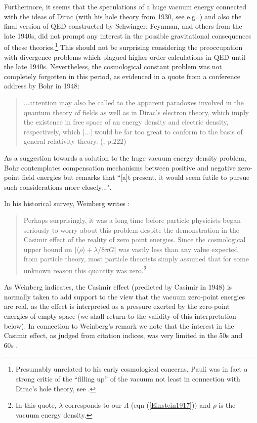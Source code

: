 \documentclass[12pt]{article}
\begin{document}
Furthermore, it seems that the speculations of a huge vacuum
energy connected with the ideas of Dirac (with his hole theory
from 1930, see e.g. \cite{schweber94}) and also the final version
of QED constructed by Schwinger, Feynman, and others from the late
1940s, did not prompt any interest in the possible gravitational
consequences of these theories.\footnote{Presumably unrelated
to his early cosmological concerns, Pauli was in fact a strong
critic of the ``filling up'' of the vacuum not least in connection
with Dirac's hole theory, see \cite{weisskopf83}.} This should not
be surprising considering the preoccupation with divergence
problems which plagued higher order calculations in QED until the
late 1940s. Nevertheless, the cosmological constant problem was
not completely forgotten in this period, as evidenced in a 
quote from a conference address by Bohr in 1948:

\begin{quote}
...attention may also be called to the apparent paradoxes
involved in the quantum theory of fields as well as in Dirac's
electron theory, which imply the existence in free space of an
energy density and electric density, respectively, which [...]
would be far too great to conform to the basis of general
relativity theory. (\cite{bohr48}, p.222) 
\end{quote}
As a suggestion towards a solution to the huge vacuum energy density
problem, Bohr contemplates compensation mechanisms between
positive and negative zero-point field energies but remarks that
``[a]t present, it would seem futile to pursue such considerations
more closely...". 

In his historical survey, Weinberg writes \cite{Weinberg89}:
\begin{quote} 
Perhaps surprisingly, it was a long time before
particle physicists began seriously to worry about this problem
despite the demonstration in the Casimir effect of the reality of
zero point energies. Since the cosmological upper bound on $ | \langle
\rho \rangle + \lambda / 8 \pi G | $ was vastly less than any value
expected from particle theory, most particle theorists simply
assumed that for some unknown reason this quantity was 
zero.\footnote{In
this quote, $\lambda$ corresponds to our $\Lambda$ (eqn
(\ref{Einstein1917})) and $\rho$ is the vacuum energy density.}
\end{quote} 
As Weinberg indicates, the Casimir effect (predicted by Casimir in
1948) is normally taken to add support to the view that the vacuum
zero-point energies are real, as the effect is interpreted as a
pressure exerted by the zero-point energies of empty space (we shall
return to the validity of this interpretation below). In connection to
Weinberg's remark we note that the interest in the Casimir effect, as
judged from citation indices, was very limited in the 50s and 60s
\cite{rugh98}.
\end{document}

